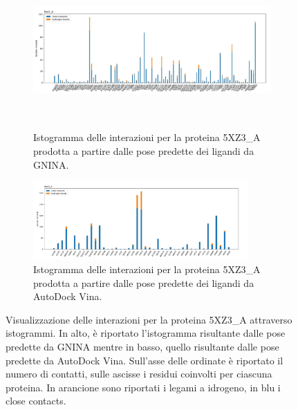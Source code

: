 \begin{figure}
    \centering
    \begin{subfigure}[b]{\textwidth}
        \centering
        \includegraphics[width=\textwidth, height=6cm]{images/chapter4/interactions/interactions_gnina_5xz3_a.jpg}
        \caption[]%
        {{\small Istogramma delle interazioni per la proteina 5XZ3\_A prodotta a partire dalle pose predette dei ligandi da GNINA.}}    
        \label{fig:interactions_gnina_5xz3_a}
    \end{subfigure}
    \hfill
    \begin{subfigure}[b]{\textwidth}  
        \centering 
        \includegraphics[width=0.9\textwidth, height=3cm]{images/chapter4/interactions/interactions_vina_5xz3_a.jpg}
        \caption[]%
        {{\small Istogramma delle interazioni per la proteina 5XZ3\_A prodotta a partire dalle pose predette dei ligandi da AutoDock Vina.}}    
        \label{fig:interactions_vina_5xz3_a}
    \end{subfigure}
    \caption[Visualizzazione degli istogrammi per la proteina 5XZ3\_A.]
    {\small Visualizzazione delle interazioni per la proteina 5XZ3\_A attraverso istogrammi. In alto, è riportato l'istogramma risultante dalle pose predette da GNINA mentre in basso, quello risultante dalle pose predette da AutoDock Vina. Sull'asse delle ordinate è riportato il numero di contatti, sulle ascisse i residui coinvolti per ciascuna proteina. In arancione sono riportati i legami a idrogeno, in blu i close contacts.} 
    \label{fig:int_5xz3_a}
\end{figure}

